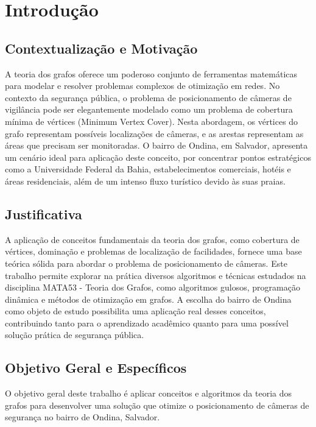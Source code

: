\documentclass[12pt, a4paper]{report}
\begin{document}

\newpage
\tableofcontents
\thispagestyle{empty}
\newpage
\setcounter{page}{1}
\pagestyle{plain}


\chapter{Introdução}

\section{Contextualização e Motivação}
A teoria dos grafos oferece um poderoso conjunto de ferramentas matemáticas para modelar e resolver problemas complexos de otimização em redes. No contexto da segurança pública, o problema de posicionamento de câmeras de vigilância pode ser elegantemente modelado como um problema de cobertura mínima de vértices (Minimum Vertex Cover). Nesta abordagem, os vértices do grafo representam possíveis localizações de câmeras, e as arestas representam as áreas que precisam ser monitoradas. O bairro de Ondina, em Salvador, apresenta um cenário ideal para aplicação deste conceito, por concentrar pontos estratégicos como a Universidade Federal da Bahia, estabelecimentos comerciais, hotéis e áreas residenciais, além de um intenso fluxo turístico devido às suas praias.

\section{Justificativa}
A aplicação de conceitos fundamentais da teoria dos grafos, como cobertura de vértices, dominação e problemas de localização de facilidades, fornece uma base teórica sólida para abordar o problema de posicionamento de câmeras. Este trabalho permite explorar na prática diversos algoritmos e técnicas estudados na disciplina MATA53 - Teoria dos Grafos, como algoritmos gulosos, programação dinâmica e métodos de otimização em grafos. A escolha do bairro de Ondina como objeto de estudo possibilita uma aplicação real desses conceitos, contribuindo tanto para o aprendizado acadêmico quanto para uma possível solução prática de segurança pública.

\section{Objetivo Geral e Específicos}
O objetivo geral deste trabalho é aplicar conceitos e algoritmos da teoria dos grafos para desenvolver uma solução que otimize o posicionamento de câmeras de segurança no bairro de Ondina, Salvador.
\end{document}
